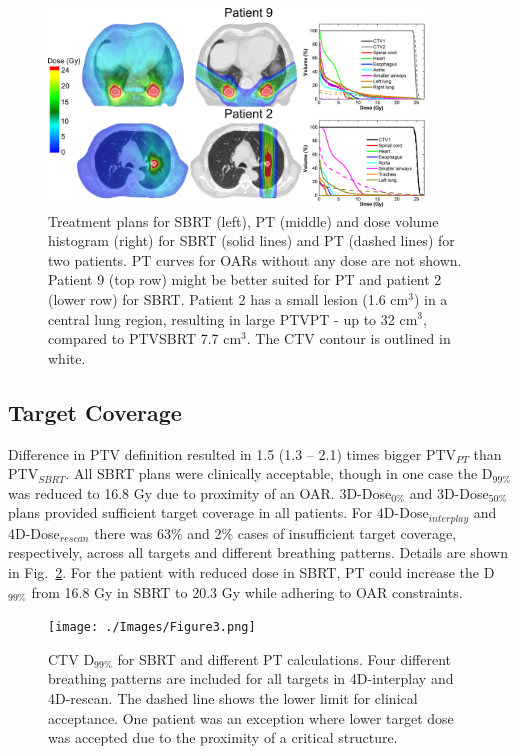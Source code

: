 \documentclass[type=dr, dr=rernat, acm$^3$entcolor=tud7b,colorbacktitle, bigchapter, openright, twoside, 12pt ]{tudthesis}
\begin{document}
\begin{figure}[H]
\begin{center}
\includegraphics[width=0.9\textwidth]{./Images/Figure2.png}
\caption{Treatment plans for SBRT (left), PT (middle) and dose volume histogram (right) for SBRT (solid lines) and PT (dashed lines) for two patients. PT curves for OARs without any dose are not shown. Patient 9 (top row) might be better suited for PT and patient 2 (lower row) for SBRT. Patient 2 has a small lesion (1.6 cm$^{3}$) in a central lung region, resulting in large PTVPT - up to 32 cm$^{3}$, compared to PTVSBRT 7.7 cm$^{3}$. The CTV contour is outlined in white.}
\label{Fig:TreatmentPlans}
\end{center}
\end{figure}

\subsection{Target Coverage}

Difference in PTV definition resulted in 1.5 (1.3 – 2.1) times bigger PTV$_{PT}$ than PTV$_{SBRT}$. All SBRT plans were clinically acceptable, though in one case the D$_{99\%}$ was reduced to 16.8 Gy due to proximity of an OAR. 3D-Dose$_{0\%}$ and 3D-Dose$_{50\%}$plans provided sufficient target coverage in all patients. For 4D-Dose$_{interplay}$ and 4D-Dose$_{rescan}$ there was 63\% and 2\% cases of insufficient target coverage, respectively, across all targets and different breathing patterns. Details are shown in Fig.~\ref{Fig:InterplayDiff}. For the patient with reduced dose in SBRT, PT could increase the D$_{99\%}$ from 16.8 Gy in SBRT to 20.3 Gy while adhering to OAR constraints. 


\begin{figure}[H]
\begin{center}
\texttt{[image: ./Images/Figure3.png]}
\caption{CTV D$_{99\%}$ for SBRT and different PT calculations. Four different breathing patterns are included for all targets in 4D-interplay and 4D-rescan. The dashed line shows the lower limit for clinical acceptance. One patient was an exception where lower target dose was accepted due to the proximity of a critical structure.  }
\label{Fig:InterplayDiff}
\end{center}
\end{figure}
\end{document}
